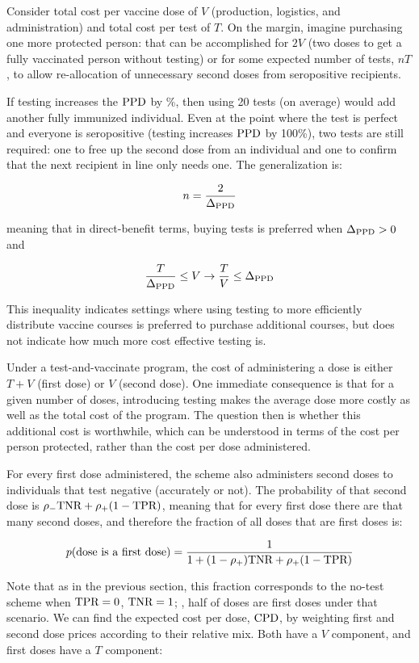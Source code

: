 \documentclass{article}
\begin{document}
Consider total cost per vaccine dose of $V$ (\ie* production, logistics, and administration) and total cost per test of $T$. On the margin, imagine purchasing one more protected person: that can be accomplished for $2V$ (\ie* two doses to get a fully vaccinated person without testing) or for some expected number of tests, $nT$, to allow re-allocation of unnecessary second doses from seropositive recipients.

If testing increases the $\textrm{PPD}$ by \%, then using 20 tests (on average) would add another fully immunized individual. Even at the point where the test is perfect and everyone is seropositive (\ie* testing increases $\textrm{PPD}$ by 100\%), two tests are still required: one to free up the second dose from an individual and one to confirm that the next recipient in line only needs one. The generalization is:

$$
n = \frac{2}{\Delta_{\textrm{PPD}}}
$$

meaning that in direct-benefit terms, buying tests is preferred when $\Delta_{\textrm{PPD}} > 0$ and

$$
\frac{T}{\Delta_{\textrm{PPD}}} \le V \rightarrow \frac{T}{V} \le \Delta_{\textrm{PPD}}
$$

This inequality indicates settings where using testing to more efficiently distribute vaccine courses is preferred to purchase additional courses, but does not indicate how much more cost effective testing is.

Under a test-and-vaccinate program, the cost of administering a dose is either $T+V$ (first dose) or $V$ (second dose). One immediate consequence is that for a given number of doses, introducing testing makes the average dose more costly as well as the total cost of the program. The question then is whether this additional cost is worthwhile, which can be understood in terms of the cost per person protected, rather than the cost per dose administered.

For every first dose administered, the scheme also administers second doses to individuals that test negative (accurately or not). The probability of that second dose is $\rho_{{-}}\textrm{TNR} + \rho_{{+}}(1-\textrm{TPR})$, meaning that for every first dose there are that many second doses, and therefore the fraction of all doses that are first doses is:

$$
p(\textrm{dose is a first dose}) = \frac{1}{1+(1-\rho_{{+}})\textrm{TNR} + \rho_{{+}}(1-\textrm{TPR})} 
$$

Note that as in the previous section, this fraction corresponds to the no-test scheme when $\textrm{TPR}=0$, $\textrm{TNR}=1$; \ie*, half of doses are first doses under that scenario. We can find the expected cost per dose, $\textrm{CPD}$, by weighting first and second dose prices according to their relative mix. Both have a $V$ component, and first doses have a $T$ component:
\end{document}

